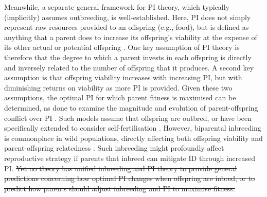 \documentclass[12pt]{article}
\begin{document}
Meanwhile, a separate general framework for PI theory, which typically (implicitly) assumes outbreeding, is well-established. Here, PI does not simply represent raw resources provided to an offspring {\color{red}\st{(e.g., food)}}, but is defined as anything that a parent does to increase its offspring's viability at the expense of its other actual or potential offspring \cite[][]{Trivers1972, Trivers1974}. One key assumption of PI theory is therefore that the degree to which a parent invests in each offspring is directly and inversely related to the number of offspring that it produces. A second key assumption is that offspring viability increases with increasing PI, but with diminishing returns on viability as more PI is provided. Given these two assumptions, the optimal PI for which parent fitness is maximised can be determined, as done to examine the magnitude and evolution of parent-offspring conflict over PI \cite[][]{Macnair1978, Parker1978, Parker1985, DeJong2005, Kuijper2012}. Such models assume that offspring are outbred, or have been specifically extended to consider self-fertilisation \cite[][]{DeJong2005}. However, biparental inbreeding is commonplace in wild populations, directly affecting both offspring viability and parent-offspring relatedness \cite[][]{Trivers1974, Lynch1998, OGrady2006, Charlesworth2009, Reid2016}. Such inbreeding might profoundly affect reproductive strategy if parents that inbreed can mitigate ID through increased PI. {\color{red}\st{Yet no theory has unified inbreeding and PI theory to provide general predictions concerning how optimal PI changes when offspring are inbred, or to predict how parents should adjust inbreeding and PI to maximise fitness.}} 
\end{document}

